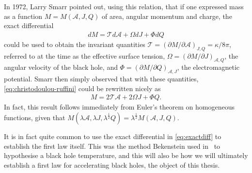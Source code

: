 \documentclass[
twoside,
openright,
frontopenright,
]{dmathesis}
\begin{document}
In 1972, Larry Smarr pointed out, using this relation, that if one expressed
mass as a function $M=M(\mathcal{A},J,Q)$ of area, angular momentum and charge,
the exact differential
\begin{align}
  \label{eq:exactdiff}
dM = \mathcal{T}d\mathcal{A} + \Omega dJ + \Phi dQ
\end{align}
could be used to obtain the invariant quantities
$\mathcal{T} = (\partial M/\partial \mathcal{A})_{J,Q} = \kappa/8\pi$, referred
to at the time as the effective surface tension,
$\Omega=(\partial M/\partial J)_{\mathcal{A},Q}$, the angular velocity of the
black hole, and $\Phi = (\partial M/\partial Q)_{\mathcal{A},J}$, the
electromagnetic potential. Smarr then simply observed that with these
quantities, \cref{eq:christodoulou-ruffini} could be rewritten nicely as
\begin{align}
  \label{eq:smarrrelation}
  M = 2\mathcal{T}\mathcal{A} + 2\Omega J + \Phi Q.
\end{align}
In fact, this result follows immediately from Euler's theorem on homogeneous
functions, given that $M(\lambda\mathcal{A}, \lambda J, \lambda^\frac12 Q) =
\lambda^\frac12 M(\mathcal{A},J,Q)$.

It is in fact quite common to use the exact differential in \cref{eq:exactdiff}
to establish the first law itself. This was the method Bekenstein used
in~\cite{Bekenstein:1973ur} to hypothesise a black hole temperature, and this
will also be how we will ultimately establish a first law for accelerating black
holes, the object of this thesis. 
\end{document}
